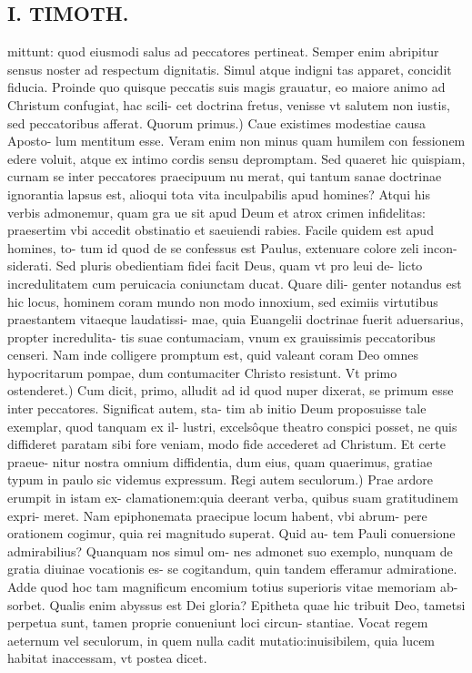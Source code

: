 \documentclass{article}
\begin{document}
\begin{pages}
\section*{I. TIMOTH. }
\marginpar{[ p.12 ]}\pstart mittunt: quod eiusmodi salus ad peccatores pertineat. Semper enim abripitur sensus noster ad respectum dignitatis. Simul atque indigni tas apparet, concidit fiducia. Proinde quo quisque peccatis suis magis grauatur, eo maiore animo ad Christum confugiat, hac scili- cet doctrina fretus, venisse vt salutem non iustis, sed peccatoribus afferat.  \pend\pstart Quorum primus.) Caue existimes modestiae causa Aposto- lum mentitum esse. Veram enim non minus quam humilem con fessionem edere voluit, atque ex intimo cordis sensu depromptam. Sed quaeret hic quispiam, curnam se inter peccatores praecipuum nu merat, qui tantum sanae doctrinae ignorantia lapsus est, alioqui tota vita inculpabilis apud homines? Atqui his verbis admonemur, quam gra ue sit apud Deum et atrox crimen infidelitas: praesertim vbi accedit obstinatio et saeuiendi rabies. Facile quidem est apud homines, to- tum id quod de se confessus est Paulus, extenuare colore zeli incon- siderati. Sed pluris obedientiam fidei facit Deus, quam vt pro leui de- licto incredulitatem cum peruicacia coniunctam ducat. Quare dili- genter notandus est hic locus, hominem coram mundo non modo innoxium, sed eximiis virtutibus praestantem vitaeque laudatissi- mae, quia Euangelii doctrinae fuerit aduersarius, propter incredulita- tis suae contumaciam, vnum ex grauissimis peccatoribus censeri. Nam inde colligere promptum est, quid valeant coram Deo omnes hypocritarum pompae, dum contumaciter Christo resistunt.  \pend\pstart Vt primo ostenderet.) Cum dicit, primo, alludit ad id quod nuper dixerat, se primum esse inter peccatores. Significat autem, sta- tim ab initio Deum proposuisse tale exemplar, quod tanquam ex il- lustri, excelsôque theatro conspici posset, ne quis diffideret paratam sibi fore veniam, modo fide accederet ad Christum. Et certe praeue- nitur nostra omnium diffidentia, dum eius, quam quaerimus, gratiae typum in paulo sic videmus expressum.  \pend\pstart Regi autem seculorum.) Prae ardore erumpit in istam ex- clamationem:quia deerant verba, quibus suam gratitudinem expri- meret. Nam epiphonemata praecipue locum habent, vbi abrum- pere orationem cogimur, quia rei magnitudo superat. Quid au- tem Pauli conuersione admirabilius? Quanquam nos simul om- nes admonet suo exemplo, nunquam de gratia diuinae vocationis es- se cogitandum, quin tandem efferamur admiratione. Adde quod hoc tam magnificum encomium totius superioris vitae memoriam ab- sorbet. Qualis enim abyssus est Dei gloria? Epitheta quae hic tribuit Deo, tametsi perpetua sunt, tamen proprie conueniunt loci circun- stantiae. Vocat regem aeternum vel seculorum, in quem nulla cadit mutatio:inuisibilem, quia lucem habitat inaccessam, vt postea dicet.  \pend

\end{pages}
\end{document}
